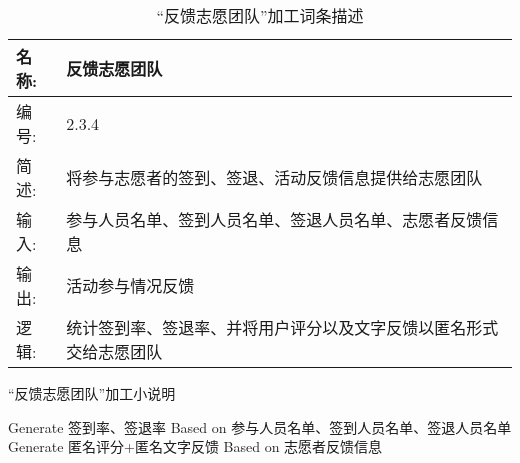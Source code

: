 \begin{table}[H]  
\caption{``反馈志愿团队”加工词条描述}  
\begin{center}  
    \begin{tabular}{l p{11cm}} 
        \hline
        \quad 名称: & 反馈志愿团队\\
        \hline
        \quad 编号: & 2.3.4 \\
        \hline
        \quad 简述: & 将参与志愿者的签到、签退、活动反馈信息提供给志愿团队 \\
        \hline
        \quad 输入:& 参与人员名单、签到人员名单、签退人员名单、志愿者反馈信息 \\
        \hline
        \quad 输出:& 活动参与情况反馈\\
        \hline
        \quad 逻辑:& 统计签到率、签退率、并将用户评分以及文字反馈以匿名形式交给志愿团队 \\
        \hline
    \end{tabular}
    \label{tab1}
\end{center}
\end{table}

\begin{algorithm}[H]
    \renewcommand{\thealgorithm}{}
    \caption{``反馈志愿团队”加工小说明} 
    \label{alg3} 
    \begin{algorithmic}[1]
        \STATE Generate 签到率、签退率 Based on 参与人员名单、签到人员名单、签退人员名单
        \STATE Generate 匿名评分+匿名文字反馈 Based on 志愿者反馈信息
    \end{algorithmic} 
\end{algorithm}